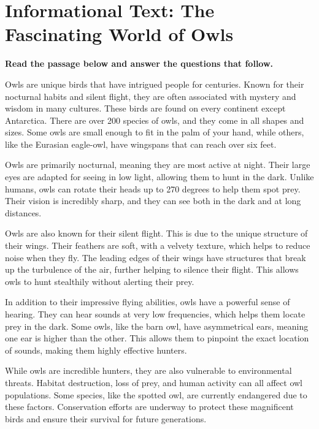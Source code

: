 \documentclass[12pt]{article}
\begin{document}
\onehalfspacing

\section*{Informational Text: The Fascinating World of Owls}

\textbf{Read the passage below and answer the questions that follow.}

Owls are unique birds that have intrigued people for centuries. Known for their nocturnal habits and silent flight, they are often associated with mystery and wisdom in many cultures. These birds are found on every continent except Antarctica. There are over 200 species of owls, and they come in all shapes and sizes. Some owls are small enough to fit in the palm of your hand, while others, like the Eurasian eagle-owl, have wingspans that can reach over six feet.

Owls are primarily nocturnal, meaning they are most active at night. Their large eyes are adapted for seeing in low light, allowing them to hunt in the dark. Unlike humans, owls can rotate their heads up to 270 degrees to help them spot prey. Their vision is incredibly sharp, and they can see both in the dark and at long distances.

Owls are also known for their silent flight. This is due to the unique structure of their wings. Their feathers are soft, with a velvety texture, which helps to reduce noise when they fly. The leading edges of their wings have structures that break up the turbulence of the air, further helping to silence their flight. This allows owls to hunt stealthily without alerting their prey.

In addition to their impressive flying abilities, owls have a powerful sense of hearing. They can hear sounds at very low frequencies, which helps them locate prey in the dark. Some owls, like the barn owl, have asymmetrical ears, meaning one ear is higher than the other. This allows them to pinpoint the exact location of sounds, making them highly effective hunters.

While owls are incredible hunters, they are also vulnerable to environmental threats. Habitat destruction, loss of prey, and human activity can all affect owl populations. Some species, like the spotted owl, are currently endangered due to these factors. Conservation efforts are underway to protect these magnificent birds and ensure their survival for future generations.

\newpage
\end{document}
